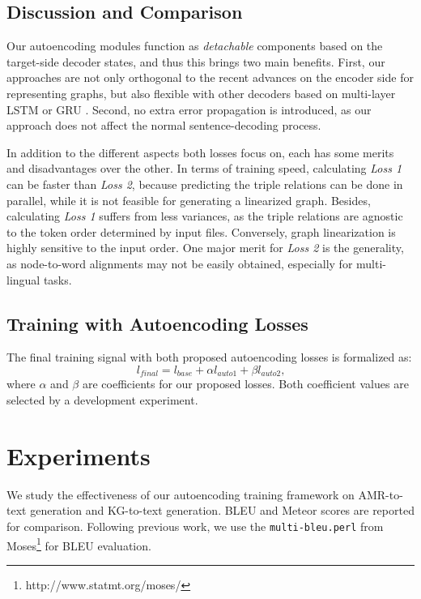 \documentclass[11pt,a4paper]{article}
\begin{document}
\subsection{Discussion and Comparison}


Our autoencoding modules function as \emph{detachable} components based on the target-side decoder states, and thus this brings two main benefits.
First, our approaches are not only orthogonal to the recent advances \citep{li2015gated,kipf2016semi,velivckovic2017graph} on the encoder side for representing graphs, but also flexible with other decoders based on multi-layer LSTM \citep{hochreiter1997long} or GRU \citep{cho2014learning}.
Second, no extra error propagation is introduced, as our approach does not affect the normal sentence-decoding process.


In addition to the different aspects both losses focus on, each has some merits and disadvantages over the other.
In terms of training speed, calculating \emph{Loss 1} can be faster than \emph{Loss 2}, because predicting the triple relations can be done in parallel, while it is not feasible for generating a linearized graph.
Besides, calculating \emph{Loss 1} suffers from less variances, as the triple relations are agnostic to the token order determined by input files.
Conversely, graph linearization is highly sensitive to the input order.
One major merit for \emph{Loss 2} is the generality, as node-to-word alignments may not be easily obtained, especially for multi-lingual tasks.


\subsection{Training with Autoencoding Losses}


The final training signal with both proposed autoencoding losses is formalized as:
\begin{equation}
    l_{final} = l_{base} + \alpha l_{auto1} + \beta l_{auto2} \text{,}
\end{equation}
where $\alpha$ and $\beta$ are coefficients for our proposed losses.
Both coefficient values are selected by a development experiment.


\section{Experiments}


We study the effectiveness of our autoencoding training framework on AMR-to-text generation and KG-to-text generation.
BLEU \cite{papineni2002bleu} and Meteor \cite{denkowski:lavie:meteor-wmt:2014} scores are reported for comparison. Following previous work, we use the \texttt{multi-bleu.perl} from Moses\footnote{http://www.statmt.org/moses/} for BLEU evaluation.
\end{document}
